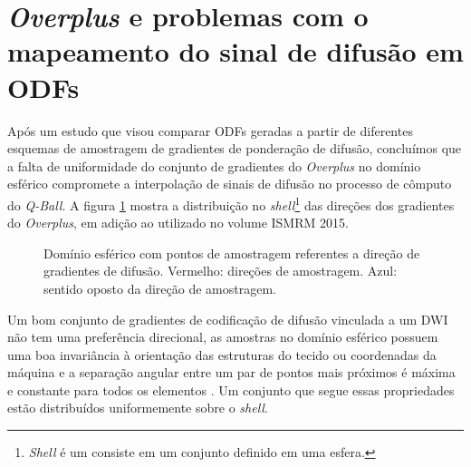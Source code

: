 \documentclass[
    12pt,                %
    oneside,            %
    a4paper,            %
    english,            %
    french,                %
    spanish,            %
    brazil                %
    ]{abntex2}
\begin{document}
\section{\textit{Overplus} e problemas com o mapeamento do sinal de difusão em ODFs}
\label{ssec::problema_overplus}

Após um estudo que visou comparar ODFs geradas a partir de diferentes esquemas de amostragem de gradientes de ponderação de difusão, concluímos que a falta de uniformidade do conjunto de gradientes do \textit{Overplus} no domínio esférico compromete a interpolação de sinais de difusão no processo de cômputo do \textit{Q-Ball}. A figura \ref{fig::shell_Overplus_VS_ISMRM} mostra a distribuição no \textit{shell}\footnote{\textit{Shell} é um consiste em um conjunto definido em uma esfera.} das direções dos gradientes do \textit{Overplus}, em adição ao utilizado no volume ISMRM 2015.

\begin{figure}[ht]
\centering
\captionsetup[subfloat]{farskip=5pt,nearskip=0pt}
    \hfill
     \caption{Domínio esférico com pontos de amostragem referentes a direção de gradientes de difusão. Vermelho: direções de amostragem. Azul: sentido oposto da direção de amostragem.}
    \label{fig::shell_Overplus_VS_ISMRM}
\end{figure}


Um bom conjunto de gradientes de codificação de difusão vinculada a um DWI não tem uma preferência direcional, as amostras no domínio esférico possuem uma boa invariância à orientação das estruturas do tecido ou coordenadas da máquina e a separação angular entre um par de pontos mais próximos é máxima e constante para todos os elementos \cite{cheng2018}. Um conjunto que segue essas propriedades estão distribuídos uniformemente sobre o \textit{shell}.
\end{document}
